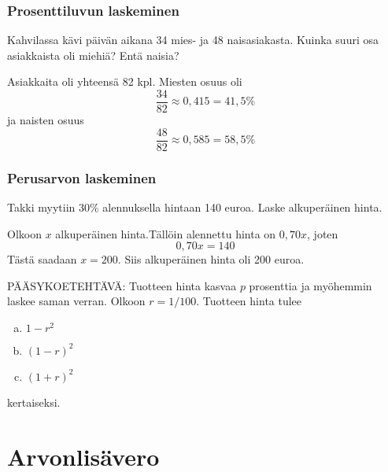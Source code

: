 \documentclass[handout]{beamer}
\begin{document}
\begin{frame}
\frametitle{Prosenttiluvun laskeminen}
	\pause 
	\begin{esim}
		Kahvilassa kävi päivän aikana 34 mies- ja 48 naisasiakasta. Kuinka suuri osa asiakkaista oli miehiä? Entä naisia?
	\end{esim}
	\pause
	\begin{ratkaisu}
		Asiakkaita oli yhteensä 82 kpl. \pause Miesten osuus oli
		\[
			\frac{34}{82} \approx 0,415 = 41,5\%
		\]
		\pause
		ja naisten osuus
		\[
			\frac{48}{82} \approx 0,585 = 58,5 \%
		\]
		
	\end{ratkaisu}
\end{frame}

\begin{frame}
\frametitle{Perusarvon laskeminen}
	\begin{esim}
		Takki myytiin 30\% alennuksella hintaan 140 euroa. Laske alkuperäinen hinta.
	\end{esim}
	\begin{ratkaisu}
		Olkoon \(x\) alkuperäinen hinta.\pause Tällöin alennettu hinta on \(0,70x\)\pause , joten
		\[
			0,70x = 140
		\]
		\pause Tästä saadaan \(x=200\). \pause Siis alkuperäinen hinta oli 200 euroa.
	\end{ratkaisu}
\end{frame}

\begin{frame}
  \begin{esim}
    PÄÄSYKOETEHTÄVÄ: Tuotteen hinta kasvaa \(p\) prosenttia ja myöhemmin laskee saman verran. Olkoon \(r=1/100\). Tuotteen hinta tulee 
    \begin{enumerate}[(a)]
      \item \(1-r^2\) 
      \item \((1-r)^2\)
      \item \((1+r)^2\)
    \end{enumerate}
    kertaiseksi.
  \end{esim}
\end{frame}


%

\section{Arvonlisävero}
\end{document}
